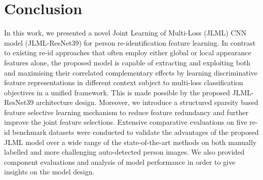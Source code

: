 \documentclass{article}
\begin{document}
\section{Conclusion}
In this work, we presented a novel Joint Learning of Multi-Loss (JLML)
CNN model (JLML-ResNet39)
for person re-identification feature learning.
In contrast to existing re-id approaches
that often employ either global or local appearance features alone,
the proposed model is capable of extracting and exploiting both and maximising their correlated complementary effects by
learning discriminative feature representations in different context subject to
multi-loss classification objectives in a unified framework.
This is made possible by the proposed JLML-ResNet39 architecture design.
Moreover, we introduce a structured sparsity based feature selective learning mechanism
to reduce feature redundancy and further improve the joint feature selections. 
Extensive comparative
evaluations on five re-id benchmark datasets 
were conducted to validate the advantages of
the proposed JLML model over a wide range of the state-of-the-art methods 
on both manually labelled and more challenging auto-detected person images.
We also provided component evaluations and analysis of model
performance in order to give insights on the model design.











\small


\end{document}
